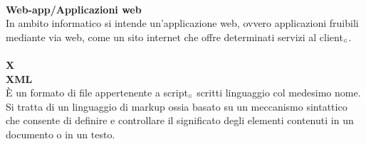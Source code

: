 \\
\textbf{Web-app/Applicazioni web}\\
In ambito informatico si intende un'applicazione web, ovvero applicazioni fruibili mediante via web, come un sito internet che offre determinati servizi al client$_{\scaleto{G}{3pt}}$.\\
\\
\textbf{X}
\\
\textbf{XML}\\
È un formato di file appertenente a script$_{\scaleto{G}{3pt}}$ scritti linguaggio col medesimo nome.
Si tratta di un linguaggio di markup ossia basato su un meccanismo sintattico che consente di definire e controllare il significato degli elementi contenuti in un documento o in un testo.\\
\\
